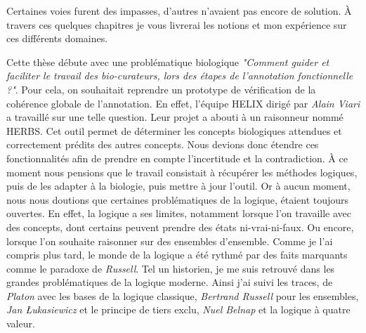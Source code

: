 \begin{refsegment}
Certaines voies furent des impasses, d'autres n'avaient pas encore de solution. À travers ces quelques chapitres je vous livrerai les notions et mon expérience sur ces différents domaines.

Cette thèse débute avec une problématique biologique \textit{"Comment guider et faciliter le travail des bio-curateurs, lors des étapes de l'annotation fonctionnelle ?"}. Pour cela, on souhaitait reprendre un prototype de vérification de la cohérence globale de l'annotation. En effet, l'équipe HELIX dirigé par \textit{Alain Viari} a travaillé sur une telle question. Leur projet a abouti à un raisonneur nommé HERBS. Cet outil permet de déterminer les concepts biologiques attendues et correctement prédits des autres concepts. Nous devions donc étendre ces fonctionnalités afin de prendre en compte l'incertitude et la contradiction. À ce moment nous pensions que le travail consistait à récupérer les méthodes logiques, puis de les adapter à la biologie, puis mettre à jour l'outil. Or à aucun moment, nous nous doutions que certaines problématiques de la logique, étaient toujours ouvertes. En effet, la logique a ses limites, notamment lorsque l'on travaille avec des concepts, dont certains peuvent prendre des états ni-vrai-ni-faux. Ou encore, lorsque l'on souhaite raisonner sur des ensembles d'ensemble. Comme je l'ai compris plus tard, le monde de la logique a été rythmé par des faits marquants comme le paradoxe de \textit{Russell}. Tel un historien, je me suis retrouvé dans les grandes problématiques de la logique moderne. Ainsi j'ai suivi les traces, de \textit{Platon} avec les bases de la logique classique, \textit{Bertrand Russell} pour les ensembles, \textit{Jan Łukasiewicz} et le principe de tiers exclu, \textit{Nuel Belnap} et la logique à quatre valeur.



\end{refsegment}
